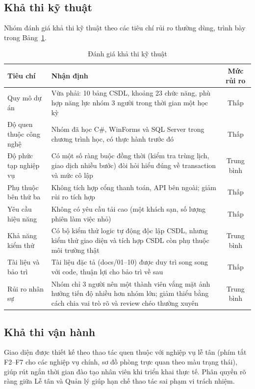 \documentclass[14pt]{report}
\begin{document}
\subsection{Khả thi kỹ thuật}

Nhóm đánh giá khả thi kỹ thuật theo các tiêu chí rủi ro thường dùng, trình bày trong Bảng~\ref{tab:khathi-kythuat}.

\begin{table}[H]
\centering
\caption{Đánh giá khả thi kỹ thuật}
\label{tab:khathi-kythuat}
\begin{tabularx}{\textwidth}{|l|X|c|}
\hline
\textbf{Tiêu chí} & \textbf{Nhận định} & \textbf{Mức rủi ro} \\\hline
Quy mô dự án & Vừa phải: 10 bảng CSDL, khoảng 23 chức năng, phù hợp năng lực nhóm 3 người trong thời gian một học kỳ & Thấp \\\hline
Độ quen thuộc công nghệ & Nhóm đã học C\#, WinForms và SQL Server trong chương trình học, có thực hành trước đó & Thấp \\\hline
Độ phức tạp nghiệp vụ & Có một số ràng buộc đồng thời (kiểm tra trùng lịch, giao dịch nhiều bước) đòi hỏi hiểu đúng về transaction và mức cô lập & Trung bình \\\hline
Phụ thuộc bên thứ ba & Không tích hợp cổng thanh toán, API bên ngoài; giảm rủi ro tích hợp & Thấp \\\hline
Yêu cầu hiệu năng & Không có yêu cầu tải cao (một khách sạn, số lượng phiên làm việc nhỏ) & Thấp \\\hline
Khả năng kiểm thử & Có bộ kiểm thử logic tự động độc lập CSDL, nhưng kiểm thử giao diện và tích hợp CSDL còn phụ thuộc môi trường thật & Trung bình \\\hline
Tài liệu và bảo trì & Tài liệu đặc tả (docs/01--10) được duy trì song song với code, thuận lợi cho bảo trì về sau & Thấp \\\hline
Rủi ro nhân sự & Nhóm chỉ 3 người nên một thành viên vắng mặt ảnh hưởng tiến độ nhiều hơn nhóm lớn; giảm thiểu bằng cách chia vai trò rõ và review chéo thường xuyên & Trung bình \\\hline
\end{tabularx}
\end{table}

\subsection{Khả thi vận hành}

Giao diện được thiết kế theo thao tác quen thuộc với nghiệp vụ lễ tân (phím tắt F2--F7 cho các nghiệp vụ chính, sơ đồ phòng trực quan theo màu trạng thái), giúp rút ngắn thời gian đào tạo nhân viên khi triển khai thực tế. Phân quyền rõ ràng giữa Lễ tân và Quản lý giúp hạn chế thao tác sai phạm vi trách nhiệm.
\end{document}
